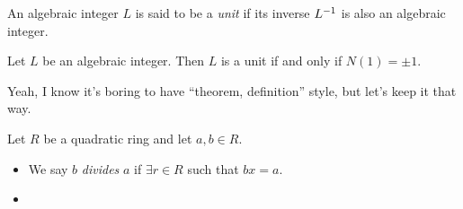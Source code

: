 \begin{definition}
  An algebraic integer $L$ is said to be a \emph{unit}
  if its inverse $L^{-1}$ is also an algebraic integer.
\end{definition}

\begin{proposition}
  Let $L$ be an algebraic integer. Then 
  $L$ is a unit if and only if $N(1)=\pm 1$.
\end{proposition}

Yeah, I know it's boring to have ``theorem, definition'' style, 
but let's keep it that way.

\begin{definition}
  Let $R$ be a quadratic ring and let $a,b\in R$.
  \begin{itemize}
    \item We say $b$ \emph{divides} $a$ if $\exists r\in R$ such that $bx=a$.
    \item 
  \end{itemize}
\end{definition}









